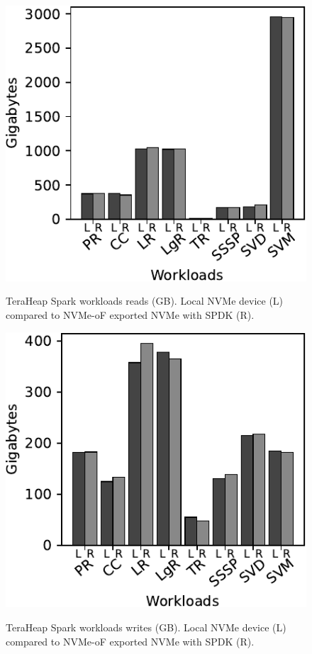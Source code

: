 \begin{figure}[H]
  \includegraphics[width=\linewidth]{figures/spark_r.pdf}\\
\caption{TeraHeap Spark workloads reads (GB). Local NVMe device (L) compared to NVMe-oF exported NVMe with SPDK (R).}
\label{fig:spark_r}
\end{figure}
\begin{figure}[H]
  \includegraphics[width=\linewidth]{figures/spark_w.pdf}\\
\caption{TeraHeap Spark workloads writes (GB). Local NVMe device (L) compared to NVMe-oF exported NVMe with SPDK (R).}
\label{fig:spark_w}
\end{figure}
